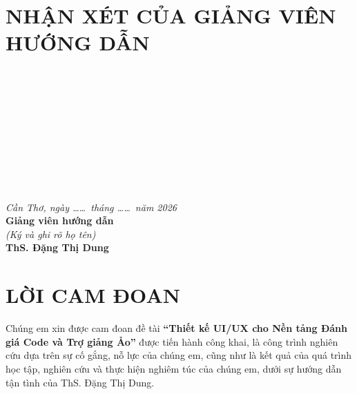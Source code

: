 \documentclass[12pt,a4paper,oneside]{report}
\begin{document}
\setcounter{page}{1}
\pagestyle{preliminary}

\chapter*{NHẬN XÉT CỦA GIẢNG VIÊN HƯỚNG DẪN}

\noindent\makebox[\linewidth]{\dotfill}\\[0.7cm]
\noindent\makebox[\linewidth]{\dotfill}\\[0.7cm]
\noindent\makebox[\linewidth]{\dotfill}\\[0.7cm]
\noindent\makebox[\linewidth]{\dotfill}\\[0.7cm]
\noindent\makebox[\linewidth]{\dotfill}\\[0.7cm]
\noindent\makebox[\linewidth]{\dotfill}\\[0.7cm]
\noindent\makebox[\linewidth]{\dotfill}\\[0.7cm]
\noindent\makebox[\linewidth]{\dotfill}\\[0.7cm]
\noindent\makebox[\linewidth]{\dotfill}\\[0.7cm]
\noindent\makebox[\linewidth]{\dotfill}

\vspace{1.5cm}

\begin{flushright}
  \textit{Cần Thơ, ngày \dots\dots\ tháng \dots\dots\ năm 2026}\\[4pt]
  \textbf{Giảng viên hướng dẫn}\\[4pt]
  \textit{(Ký và ghi rõ họ tên)}\\[2.5cm]
  \textbf{ThS. Đặng Thị Dung}
\end{flushright}

\newpage

\chapter*{LỜI CAM ĐOAN}

Chúng em xin được cam đoan đề tài \textbf{``Thiết kế UI/UX cho Nền tảng Đánh giá Code và Trợ giảng Ảo''} được tiến hành công khai, là công trình nghiên cứu dựa trên sự cố gắng, nỗ lực của chúng em, cũng như là kết quả của quá trình học tập, nghiên cứu và thực hiện nghiêm túc của chúng em, dưới sự hướng dẫn tận tình của ThS. Đặng Thị Dung.
\end{document}

